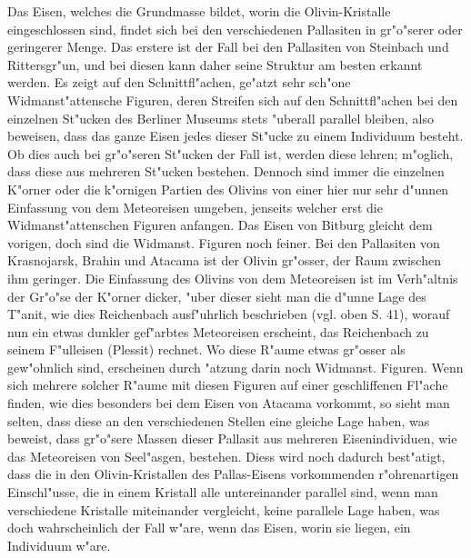 \documentclass[a4paper, 11pt, oneside]{article}
\begin{document}
Das Eisen, welches die Grundmasse bildet, worin die Olivin-Kristalle eingeschlossen sind, findet sich bei den verschiedenen Pallasiten in gr"o"serer oder geringerer Menge. Das erstere ist der Fall bei den Pallasiten von Steinbach und Rittersgr"un, und bei diesen kann daher seine Struktur am besten erkannt werden. Es zeigt auf den Schnittfl"achen, ge"atzt sehr sch"one Widmanst"attensche Figuren, deren Streifen sich auf den Schnittfl"achen bei den einzelnen St"ucken des Berliner Museums stets "uberall parallel bleiben, also beweisen, dass das ganze Eisen jedes dieser St"ucke zu einem Individuum besteht. Ob dies auch bei gr"o"seren St"ucken der Fall ist, werden diese lehren; m"oglich, dass diese aus mehreren St"ucken bestehen. Dennoch sind immer die einzelnen K"orner oder die k"ornigen Partien des Olivins von einer hier nur sehr d"unnen Einfassung von dem Meteoreisen umgeben, jenseits welcher erst die Widmanst"attenschen Figuren anfangen. Das Eisen von Bitburg gleicht dem vorigen, doch sind die Widmanst. Figuren noch feiner. Bei den Pallasiten von Krasnojarsk, Brahin und Atacama ist der Olivin gr"osser, der Raum zwischen ihm geringer. Die Einfassung des Olivins von dem Meteoreisen ist im Verh"altnis der Gr"o"se der K"orner dicker, "uber dieser sieht man die d"unne Lage des T"anit, wie dies Reichenbach ausf"uhrlich beschrieben (vgl. oben S. 41), worauf nun ein etwas dunkler gef"arbtes Meteoreisen erscheint, das Reichenbach zu seinem F"ulleisen (Plessit) rechnet. Wo diese R"aume etwas gr"osser als gew"ohnlich sind, erscheinen durch "atzung darin noch Widmanst. Figuren. Wenn sich mehrere solcher R"aume mit diesen Figuren auf einer geschliffenen Fl"ache finden, wie dies besonders bei dem Eisen von Atacama vorkommt, so sieht man selten, dass diese an den verschiedenen Stellen eine gleiche Lage haben, was beweist, dass gr"o"sere Massen dieser Pallasit aus mehreren Eisenindividuen, wie das Meteoreisen von Seel"asgen, bestehen. Diess wird noch dadurch best"atigt, dass die in den Olivin-Kristallen des Pallas-Eisens vorkommenden r"ohrenartigen Einschl"usse, die in einem Kristall alle untereinander parallel sind, wenn man verschiedene Kristalle miteinander vergleicht, keine parallele Lage haben, was doch wahrscheinlich der Fall w"are, wenn das Eisen, worin sie liegen, ein Individuum w"are.
\end{document}
